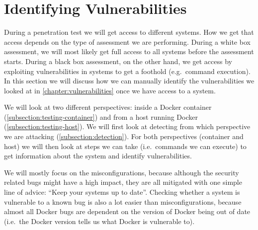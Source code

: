 \section{Identifying Vulnerabilities}\label{section:identify-vulnerabilities}
During a penetration test we will get access to different systems. How we get that access depends on the type of assessment we are performing. During a white box assessment, we will most likely get full access to all systems before the assessment starts. During a black box assessment, on the other hand, we get access by exploiting vulnerabilities in systems to get a foothold (e.g.\ command execution). In this section we will discuss how we can manually identify the vulnerabilities we looked at in \autoref{chapter:vulnerabilities} once we have access to a system.

We will look at two different perspectives: inside a Docker container (\autoref{subsection:testing-container}) and from a host running Docker (\autoref{subsection:testing-host}). We will first look at detecting from which perspective we are attacking (\autoref{subsection:detection}). For both perspectives (container and host) we will then look at steps we can take (i.e.\ commands we can execute) to get information about the system and identify vulnerabilities.

\medskip

We will mostly focus on the misconfigurations, because although the security related bugs might have a high impact, they are all mitigated with one simple line of advice: ``Keep your systems up to date''. Checking whether a system is vulnerable to a known bug is also a lot easier than misconfigurations, because almost all Docker bugs are dependent on the version of Docker being out of date (i.e.\ the Docker version tells us what Docker is vulnerable to).



